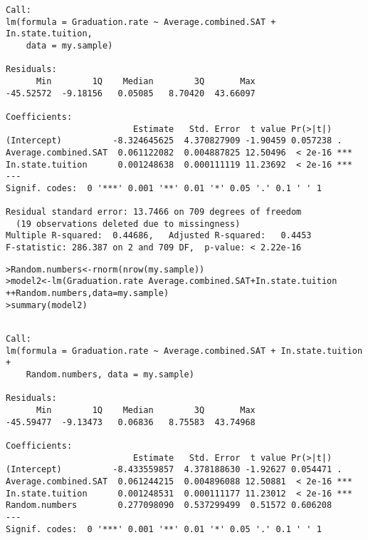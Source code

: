 \documentclass{beamer}\usepackage[]{graphicx}\usepackage[]{color}
\makeatletter
\newcommand{\hlopt}[1]{\textcolor[rgb]{1,0.894,0.769}{#1}}%
\newcommand{\hlstd}[1]{\textcolor[rgb]{1,0.894,0.769}{#1}}%
\newcommand{\hlkwb}[1]{\textcolor[rgb]{0.804,0.776,0.451}{#1}}%
\newcommand{\hlkwc}[1]{\textcolor[rgb]{0.78,0.941,0.545}{#1}}%
\newcommand{\hlkwd}[1]{\textcolor[rgb]{1,0.78,0.769}{#1}}%
\newenvironment{kframe}{%
 \def\at@end@of@kframe{}%
 \ifinner\ifhmode%
  \def\at@end@of@kframe{\end{minipage}}%
  \begin{minipage}{\columnwidth}%
 \fi\fi%
 \def\FrameCommand##1{\hskip\@totalleftmargin \hskip-\fboxsep
 \colorbox{shadecolor}{##1}\hskip-\fboxsep
     \hskip-\linewidth \hskip-\@totalleftmargin \hskip\columnwidth}%
 \MakeFramed {\advance\hsize-\width
   \@totalleftmargin\z@ \linewidth\hsize
   \@setminipage}}%
 {\par\unskip\endMakeFramed%
 \at@end@of@kframe}
\newenvironment{knitrout}{}{} %
\makeatother
\begin{document}
\begin{darkframes}
\begin{frame}[fragile]
\begin{knitrout}
\begin{kframe}
\begin{verbatim}
Call:
lm(formula = Graduation.rate ~ Average.combined.SAT + In.state.tuition, 
    data = my.sample)

Residuals:
      Min        1Q    Median        3Q       Max 
-45.52572  -9.18156   0.05085   8.70420  43.66097 

Coefficients:
                         Estimate   Std. Error  t value Pr(>|t|)    
(Intercept)          -8.324645625  4.370827909 -1.90459 0.057238 .  
Average.combined.SAT  0.061122082  0.004887825 12.50496  < 2e-16 ***
In.state.tuition      0.001248638  0.000111119 11.23692  < 2e-16 ***
---
Signif. codes:  0 '***' 0.001 '**' 0.01 '*' 0.05 '.' 0.1 ' ' 1

Residual standard error: 13.7466 on 709 degrees of freedom
  (19 observations deleted due to missingness)
Multiple R-squared:  0.44686,	Adjusted R-squared:   0.4453 
F-statistic: 286.387 on 2 and 709 DF,  p-value: < 2.22e-16
\end{verbatim}
\end{kframe}
\end{knitrout}
    \end{frame}

    \begin{frame}[fragile]
      \fontsize{8}{8}
\begin{knitrout}
\begin{kframe}
\begin{alltt}
\hlstd{> }\hlstd{Random.numbers} \hlkwb{<-} \hlkwd{rnorm}\hlstd{(}\hlkwd{nrow}\hlstd{(my.sample))}
\hlstd{> }\hlstd{model2} \hlkwb{<-} \hlkwd{lm}\hlstd{(Graduation.rate} \hlopt{~} \hlstd{Average.combined.SAT} \hlopt{+} \hlstd{In.state.tuition}
\hlstd{+ }               \hlopt{+} \hlstd{Random.numbers,} \hlkwc{data}\hlstd{=my.sample)}
\hlstd{> }\hlkwd{summary}\hlstd{(model2)}
\end{alltt}
\begin{verbatim}

Call:
lm(formula = Graduation.rate ~ Average.combined.SAT + In.state.tuition + 
    Random.numbers, data = my.sample)

Residuals:
      Min        1Q    Median        3Q       Max 
-45.59477  -9.13473   0.06836   8.75583  43.74968 

Coefficients:
                         Estimate   Std. Error  t value Pr(>|t|)    
(Intercept)          -8.433559857  4.378188630 -1.92627 0.054471 .  
Average.combined.SAT  0.061244215  0.004896088 12.50881  < 2e-16 ***
In.state.tuition      0.001248531  0.000111177 11.23012  < 2e-16 ***
Random.numbers        0.277098090  0.537299499  0.51572 0.606208    
---
Signif. codes:  0 '***' 0.001 '**' 0.01 '*' 0.05 '.' 0.1 ' ' 1


\end{verbatim}
\end{kframe}
\end{knitrout}
\end{frame}
\end{darkframes}
\end{document}
